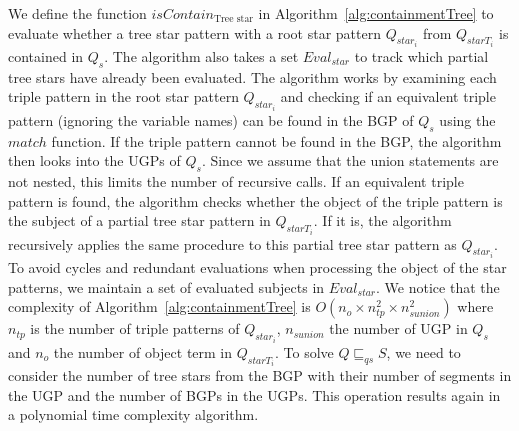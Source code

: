 We define the function $isContain_{\text{Tree star}}$ in Algorithm~\ref{alg:containmentTree} to evaluate whether a tree star pattern with a root star pattern $Q_{star_i}$ from $Q_{starT_i}$ is contained in $Q_s$. 
The algorithm also takes a set $Eval_{star}$ to track which partial tree stars have already been evaluated.
The algorithm works by examining each triple pattern in the root star pattern $Q_{star_i}$ and checking if an equivalent triple pattern (ignoring the variable names) can be found in the BGP of $Q_s$ using the $match$ function.
If the triple pattern cannot be found in the BGP, the algorithm then looks into the UGPs of $Q_s$. 
Since we assume that the union statements are not nested, this limits the number of recursive calls.
If an equivalent triple pattern is found, the algorithm checks whether the object of the triple pattern is the subject of a partial tree star pattern in $Q_{starT_i}$.
If it is, the algorithm recursively applies the same procedure to this partial tree star pattern as $Q_{star_i}$.
To avoid cycles and redundant evaluations when processing the object of the star patterns, we maintain a set of evaluated subjects in $Eval_{star}$.
We notice that the complexity of Algorithm~\ref{alg:containmentTree} is $O( n_o \times n_{tp}^2 \times n_{sunion}^2)$
where $n_{tp}$ is the number of triple patterns of $Q_{star_i}$, $n_{sunion}$ the number of UGP in $Q_s$ and $n_o$ the number of object term in $Q_{starT_i}$.
To solve $Q \sqsubseteq_{qs} S$, we need to consider the number of tree stars from the BGP with their number of segments in the UGP and the number of BGPs in the UGPs.
This operation results again in a polynomial time complexity algorithm.
